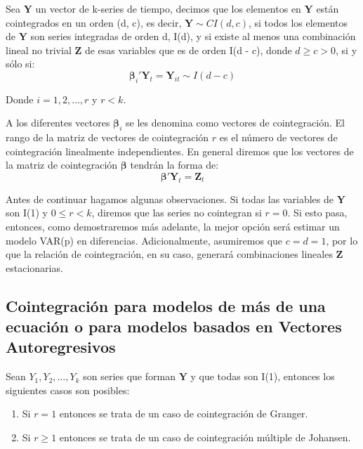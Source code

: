 \documentclass[
]{book}
\begin{document}
Sea \(\mathbf{Y}\) un vector de k-series de tiempo, decimos que los elementos en \(\mathbf{Y}\) están cointegrados en un orden (d, c), es decir, \(\mathbf{Y} \sim CI(d, c)\), si todos los elementos de \(\mathbf{Y}\) son series integradas de orden d, I(d), y si existe al menos una combinación lineal no trivial \(\mathbf{Z}\) de esas variables que es de orden I(d - c), donde \(d \geq c > 0\), si y sólo si:
\begin{equation}
    \boldsymbol{\beta}_i' \mathbf{Y}_t = \mathbf{Y}_{it} \sim I(d-c)
\end{equation}

Donde \(i = 1, 2, \ldots, r\) y \(r < k\).

A los diferentes vectores \(\boldsymbol{\beta}_i\) se les denomina como vectores de cointegración. El rango de la matriz de vectores de cointegración \(r\) es el número de vectores de cointegración linealmente independientes. En general diremos que los vectores de la matriz de cointegración \(\boldsymbol{\beta}\) tendrán la forma de:
\begin{equation}
    \boldsymbol{\beta}' \mathbf{Y}_t = \mathbf{Z}_t
\end{equation}

Antes de continuar hagamos algunas observaciones. Si todas las variables de \(\mathbf{Y}\) son I(1) y \(0 \leq r < k\), diremos que las series no cointegran si \(r = 0\). Si esto pasa, entonces, como demostraremos más adelante, la mejor opción será estimar un modelo VAR(p) en diferencias. Adicionalmente, asumiremos que \(c = d = 1\), por lo que la relación de cointegración, en su caso, generará combinaciones lineales \(\mathbf{Z}\) estacionarias.

\hypertarget{cointegraciuxf3n-para-modelos-de-muxe1s-de-una-ecuaciuxf3n-o-para-modelos-basados-en-vectores-autoregresivos}{%
\subsection{Cointegración para modelos de más de una ecuación o para modelos basados en Vectores Autoregresivos}\label{cointegraciuxf3n-para-modelos-de-muxe1s-de-una-ecuaciuxf3n-o-para-modelos-basados-en-vectores-autoregresivos}}

Sean \(Y_1, Y_2, \ldots, Y_k\) son series que forman \(\mathbf{Y}\) y que todas son I(1), entonces los siguientes casos son posibles:

\begin{enumerate}
\def\labelenumi{\arabic{enumi}.}
\item
  Si \(r = 1\) entonces se trata de un caso de cointegración de Granger.
\item
  Si \(r \geq 1\) entonces se trata de un caso de cointegración múltiple de Johansen.
\end{enumerate}
\end{document}
